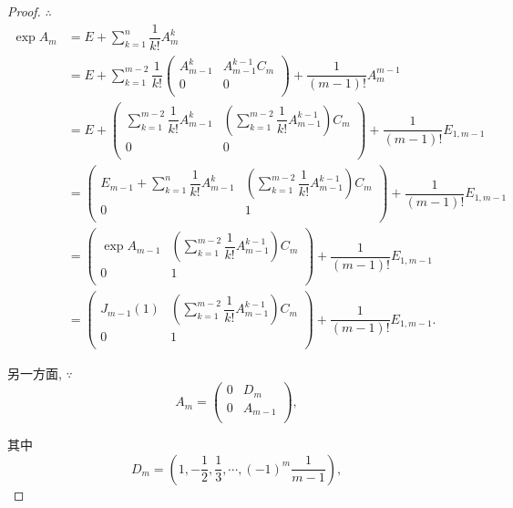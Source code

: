 \documentclass[color=black,device=normal,lang=cn,mode=geye]{elegantnote}
\begin{document}
\begin{proof}
    $\therefore$
    \begin{align*}
        \exp A_m & =E+\sum\limits_{k=1}^n\dfrac{1}{k!}A_m^k \\
        & =E+\sum\limits_{k=1}^{m-2}\dfrac{1}{k!}\begin{pmatrix}
            A_{m-1}^k & A_{m-1}^{k-1}C_m \\
            0 & 0 \\
        \end{pmatrix}+\dfrac{1}{(m-1)!}A_m^{m-1} \\
        & =E+\begin{pmatrix}
            \sum\limits_{k=1}^{m-2}\dfrac{1}{k!}A_{m-1}^k & \left(\sum\limits_{k=1}^{m-2}\dfrac{1}{k!}A_{m-1}^{k-1}\right)C_m \\
            0 & 0 \\
        \end{pmatrix}+\dfrac{1}{(m-1)!}E_{1,m-1} \\
        & =\begin{pmatrix}
            E_{m-1}+\sum\limits_{k=1}^n\dfrac{1}{k!}A_{m-1}^k & \left(\sum\limits_{k=1}^{m-2}\dfrac{1}{k!}A_{m-1}^{k-1}\right)C_m \\
            0 & 1 \\
        \end{pmatrix}+\dfrac{1}{(m-1)!}E_{1,m-1} \\
        & =\begin{pmatrix}
            \exp A_{m-1} & \left(\sum\limits_{k=1}^{m-2}\dfrac{1}{k!}A_{m-1}^{k-1}\right)C_m \\
            0 & 1 \\
        \end{pmatrix}+\dfrac{1}{(m-1)!}E_{1,m-1} \\
        & =\begin{pmatrix}
            J_{m-1}(1) & \left(\sum\limits_{k=1}^{m-2}\dfrac{1}{k!}A_{m-1}^{k-1}\right)C_m \\
            0 & 1 \\
        \end{pmatrix}+\dfrac{1}{(m-1)!}E_{1,m-1}.
    \end{align*}

    另一方面, $\because$
    \[A_m=\begin{pmatrix}
        0 & D_m \\
        0 & A_{m-1} \\
    \end{pmatrix},\]

    其中
    \[D_m=\left(1,-\dfrac{1}{2},\dfrac{1}{3},\cdots,(-1)^m\dfrac{1}{m-1}\right),\]


\end{proof}
\end{document}
